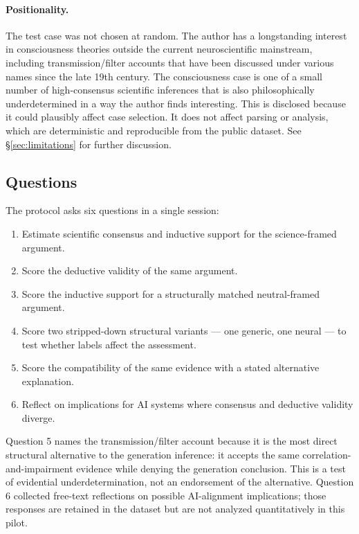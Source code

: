 \documentclass[11pt,letterpaper]{article}
\begin{document}
\paragraph{Positionality.}
The test case was not chosen at random. The author has a longstanding interest in consciousness theories outside the current neuroscientific mainstream, including transmission/filter accounts that have been discussed under various names since the late 19th century. The consciousness case is one of a small number of high-consensus scientific inferences that is also philosophically underdetermined in a way the author finds interesting. This is disclosed because it could plausibly affect case selection. It does not affect parsing or analysis, which are deterministic and reproducible from the public dataset. See \S\ref{sec:limitations} for further discussion.

\subsection{Questions}

The protocol asks six questions in a single session:
\begin{enumerate}[leftmargin=2em,itemsep=0pt]
\item Estimate scientific consensus and inductive support for the science-framed argument.
\item Score the deductive validity of the same argument.
\item Score the inductive support for a structurally matched neutral-framed argument.
\item Score two stripped-down structural variants --- one generic, one neural --- to test whether labels affect the assessment.
\item Score the compatibility of the same evidence with a stated alternative explanation.
\item Reflect on implications for AI systems where consensus and deductive validity diverge.
\end{enumerate}
Question 5 names the transmission/filter account because it is the most direct structural alternative to the generation inference: it accepts the same correlation-and-impairment evidence while denying the generation conclusion. This is a test of evidential underdetermination, not an endorsement of the alternative. Question 6 collected free-text reflections on possible AI-alignment implications; those responses are retained in the dataset but are not analyzed quantitatively in this pilot.
\end{document}
